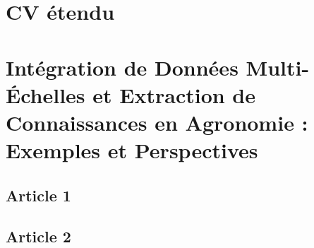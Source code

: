 \documentclass[
11pt, %
french, %
singlespacing, %
headsepline, %
]{MastersDoctoralThesis} %
\begin{document}
\mainmatter %

\pagestyle{thesis} %

\part{CV étendu} %
\label{cv} %

%


%
%
\part{Intégration de Données Multi-Échelles et Extraction de Connaissances en Agronomie : Exemples et Perspectives} %
\label{Perspectives}

% 
%
% 
% 


\printbibliography[heading=bibintoc]

%
%
%



\appendix %

\listoffigures %

\listoftables %


\chapter{Article 1}


\chapter{Article 2}

\end{document}
